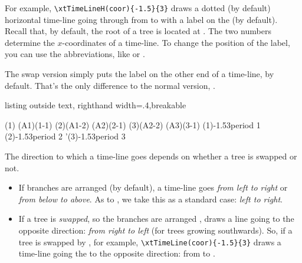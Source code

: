 For example, \verb+\xtTimeLineH(coor){-1.5}{3}+ draws a dotted (by default) horizontal time-line going through  from \xw{-1.5cm} to \xw{3cm} with a label on the  (by default).
Recall that, by default, the root of a tree is located at . The two numbers determine the $x$-coordinates of a time-line. 
To change the position of the label, you can use the abbreviations, like \xw{[a]} or \xw{[ar]}.

The swap version  simply puts the label on the other end of a time-line,  by default.
That's the only difference to the normal version, \cmd{\xtTimeLineH}.


\begin{tcblisting}{listing outside text, righthand width=.4\linewidth,breakable}
\begin{istgame}[font=\scriptsize]
\xtdistance{10mm}{20mm}
\istrootcntm(1)       \istb \istbm \endist
\istroot(A1)(1-1)     \istb \istb  \endist
\istrootcntm(2)(A1-2) \istb \istbm \endist
\istroot(A2)(2-1)     \istb \istb  \endist
\istrootcntm(3)(A2-2) \istb \istbm \endist
\istroot(A3)(3-1)     \istb \istb  \endist
\xtTimeLineH[->](1){-1.5}{3}{period 1}
\xtTimeLineH(2){-1.5}{3}{period 2}
\xtTimeLineH'(3){-1.5}{3}{period 3}
\end{istgame}
\end{tcblisting}



\remark
The direction to which a time-line goes depends on whether a tree is swapped or not. 
 
\begin{itemize}\tightlist
\item If branches are arranged  (by default), a time-line goes \emph{from left to right} or \emph{from below to above}. As to \cmd{\xtTimeLineH}, we take this as a standard case: \emph{left to right}.
\item If a tree is \emph{swapped}, so the branches are arranged , \cmd{\xtTimeLineH} draws a line going to the opposite direction: \emph{from right to left} (for trees growing southwards). So, if a tree is swapped by \icmd{\setistgrowdirection}, for example, \verb+\xtTimeLine(coor){-1.5}{3}+ draws a time-line going the to the opposite direction: from \xw{1.5cm} to \xw{-3cm}.
\end{itemize}

